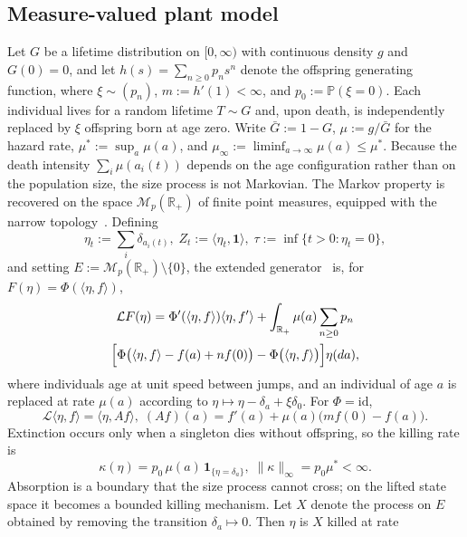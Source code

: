 \documentclass[letterpaper, 10pt, conference]{ieeeconf}
\newcommand{\R}{\mathbb{R}}
\newcommand{\rev}[1]{#1}
\newcommand{\pl}[1]{#1}
\begin{document}
\subsection{\rev{Measure-valued plant model}}\label{sec:measure}
Let $G$ be a lifetime distribution on $[0,\infty)$ with continuous density
$g$ and $G(0)=0$, and let
$h(s)=\sum_{n\ge0}p_ns^n$ denote the offspring generating function, where
$\xi\sim(p_n)$, $m:=h'(1)<\infty$, and
$p_0:=\mathbb P(\xi=0)$. Each individual lives for a random lifetime
$T\sim G$ and, upon death, is independently replaced by $\xi$ offspring born
at age zero. Write
$\bar G:=1-G$, $\mu:=g/\bar G$ for the hazard rate,
$\mu^\ast:=\sup_a\mu(a)$, and
$\mu_\infty:=\liminf_{a\to\infty}\mu(a)\le\mu^\ast$.
Because the death intensity
$\sum_i\mu(a_i(t))$ depends on the age configuration rather than on the
population size, the size process is not Markovian. The Markov property is
recovered on the space $\mathcal M_p(\R_+)$ of finite point measures,
equipped with the narrow topology~\cite{tran}. Defining
\begin{equation*}
\eta_t:=\sum_i\delta_{a_i(t)},\;
Z_t:=\langle\eta_t,\mathbf1\rangle,\;
\tau:=\inf\{t>0:\eta_t=0\},
\end{equation*}
and setting $E:=\mathcal M_p(\R_+)\setminus\{0\}$, the extended
generator~\cite{meyntweedie} is, for
$F(\eta)=\Phi(\langle\eta,f\rangle)$,
\begin{multline}
\mathcal{L}F(\eta)=
\Phi'(\langle\eta,f\rangle)\langle\eta,f'\rangle
+\int_{\R_+}\mu(a)\sum_{n\ge0}p_n\\
\Bigl[
\Phi\bigl(\langle\eta,f\rangle-f(a)+nf(0)\bigr)
-\Phi\bigl(\langle\eta,f\rangle\bigr)
\Bigr]\eta(da),
\label{eq:gen}
\end{multline}
where individuals age at unit speed between jumps, and an individual of age
$a$ is replaced at rate $\mu(a)$ according to
$\eta\mapsto\eta-\delta_a+\xi\delta_0$. For $\Phi=\mathrm{id}$,
\[
\mathcal L\langle\eta,f\rangle=\langle\eta,Af\rangle,
\;
(Af)(a)=f'(a)+\mu(a)\bigl(mf(0)-f(a)\bigr).
\]
Extinction occurs only when a singleton dies without offspring, so the killing
rate is
\begin{equation}
\kappa(\eta)=p_0\,\mu(a)\,\mathbf1_{\{\eta=\delta_a\}},
\;
\|\kappa\|_\infty=p_0\mu^\ast<\infty.
\label{eq:kappa}
\end{equation}
\pl{Absorption is a boundary that the size process cannot cross; on the lifted
state space it becomes a bounded killing mechanism.} Let $X$ denote the process on $E$ obtained
by removing the transition $\delta_a\mapsto0$. Then $\eta$ is $X$ killed at rate
\end{document}
